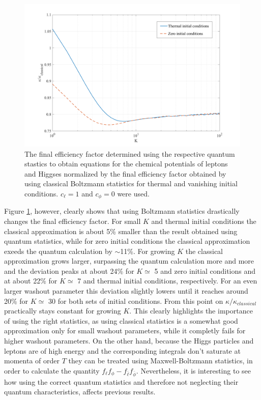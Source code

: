 \begin{figure}[H]
	\centering
	\includegraphics[width=\linewidth]{Images/quantum}
	\caption{The final efficiency factor determined using the respective quantum stastics to obtain equations for the chemical potentials of leptons and Higgses normalized by the final efficiency factor obtained by using classical Boltzmann statistics for thermal and vanishing initial conditions. $c_\ell=1$ and $c_\phi=0$ were used.}
	\label{fig:quantum}
\end{figure} \noindent
Figure \ref{fig:quantum}, however, clearly shows that using Boltzmann statistics drastically changes the final efficiency factor. For small $K$ and thermal initial conditions the classical approximation is about 5\% smaller than the result obtained using quantum statistics, while for zero initial conditions the classical approximation exeeds the quantum calculation by $\sim$11\%. For growing $K$ the classical approximation grows larger, surpassing the quantum calculation more and more and the deviation peaks at about 24\% for $K\simeq$ 5 and zero initial conditions and at about 22\% for $K\simeq$ 7 and thermal initial conditions, respectively. For an even larger washout parameter this deviation slightly lowers until it reaches around 20\% for $K\simeq$ 30 for both sets of initial conditions. From this point on $\kappa/\kappa_{classical}$ practically stays constant for growing $K$.
This clearly highlights the importance of using the right statistics, as using classical statistics is a somewhat good approximation only for small washout parameters, while it completly fails for higher washout parameters.\newline \indent
On the other hand, because the Higgs particles and leptons are of high energy and the corresponding integrals don't saturate at momenta of order $T$ they can be treated using Maxwell-Boltzmann statistics, in order to calculate the quantity $f_\ell f_\phi-f_{\bar{\ell}}f_{\bar{\phi}}$. Nevertheless, it is interesting to see how using the correct quantum statistics and therefore not neglecting their quantum characteristics, affects previous results.
